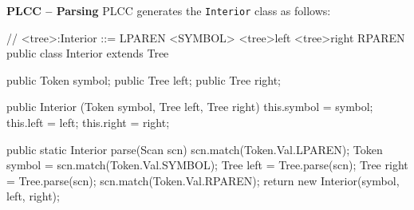 \begin{minipage}[t]{\sw}
\slidenumber
\LARGE
{\bf PLCC -- Parsing}\exx
PLCC generates the \verb'Interior' class as follows:
{\Large
\begin{qv}
// <tree>:Interior ::= LPAREN <SYMBOL> <tree>left <tree>right RPAREN
public class Interior extends Tree {

    public Token symbol;
    public Tree left;
    public Tree right;

    public Interior (Token symbol, Tree left, Tree right) {
        this.symbol = symbol;
        this.left = left;
        this.right = right;
    }

    public static Interior parse(Scan scn) {
        scn.match(Token.Val.LPAREN);
        Token symbol = scn.match(Token.Val.SYMBOL);
        Tree left = Tree.parse(scn);
        Tree right = Tree.parse(scn);
        scn.match(Token.Val.RPAREN);
        return new Interior(symbol, left, right);
    }
}
\end{qv}
}
\end{minipage}
\clearpage
